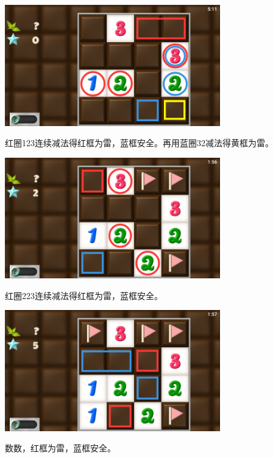\subsection{} %
\begin{center}
    \includegraphics[width=0.7\textwidth]{puzzle/50-1.png}
\end{center}
红圈123连续减法得红框为雷，蓝框安全。再用蓝圈32减法得黄框为雷。
\begin{center}
    \includegraphics[width=0.7\textwidth]{puzzle/50-2.png}
\end{center}
红圈223连续减法得红框为雷，蓝框安全。
\begin{center}
    \includegraphics[width=0.7\textwidth]{puzzle/50-3.png}
\end{center}
数数，红框为雷，蓝框安全。

